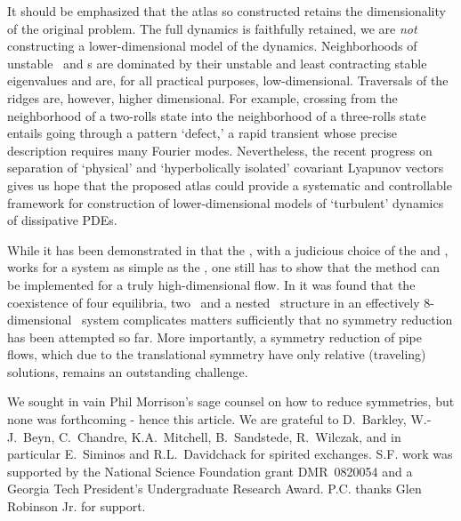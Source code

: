 \documentclass[preprint,12pt]{elsarticle} %
\begin{document}
It should be emphasized that the atlas so constructed retains the
dimensionality of the original problem. The full dynamics is faithfully
retained, we are \emph{not} constructing a lower-dimensional model of the
dynamics. Neighborhoods of unstable \eqva\ and \po s are dominated by
their unstable and least contracting stable eigenvalues and are, for all
practical purposes, low-dimensional. Traversals of the ridges are,
however, higher dimensional. For example, crossing from the neighborhood
of a two-rolls state into the neighborhood of a three-rolls state entails
going through a pattern `defect,' a rapid transient whose precise
description requires many Fourier modes. Nevertheless, the recent
progress on separation of `physical' and `hyperbolically isolated'
covariant Lyapunov
vectors gives us
hope that the proposed atlas could provide a systematic and controllable
framework for construction of lower-dimensional models of `turbulent'
dynamics of dissipative PDEs.

While it has been demonstrated in   that the \mslices,
with a judicious choice of the {\template} and {\PoincSec}, works for a
system as simple as the \cLf, one still has to show that the method can
be implemented for a truly high-dimensional flow. In  it
was found that the coexistence of four equilibria, two \reqva\ and a
nested \fixedsp\ structure in an effectively $8$-dimensional \KS\ system
complicates matters sufficiently that no symmetry reduction has been
attempted so far.
More importantly, a symmetry reduction of pipe flows, which
due to the translational symmetry have only relative (traveling)
solutions, remains an outstanding challenge.

	\medskip
We sought in vain Phil Morrison's sage counsel on how to reduce
symmetries, but none was forthcoming - hence this article. We are
grateful to
D.~Barkley,
W.-J.~Beyn,
C.~Chandre,
K.A.~Mitchell,
B.~Sandstede,
R.~Wilczak,
and in particular E.~Siminos and R.L.~Davidchack
for spirited exchanges.
S.F. work was supported by the National Science Foundation grant
DMR~0820054 and a Georgia Tech President's Undergraduate Research Award.
P.C. thanks Glen Robinson Jr. for support. 	
\appendix
\end{document}
